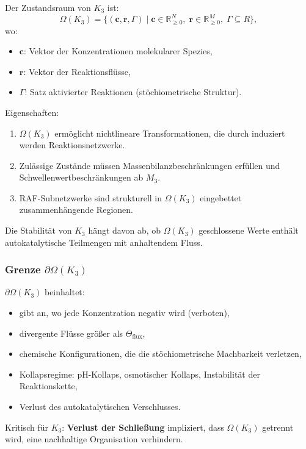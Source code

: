 Der Zustandsraum von $K_3$ ist:
\[
\Omega(K_3) = \{ (\mathbf{c}, \mathbf{r}, \Gamma) \mid
\mathbf{c} \in \mathbb{R}_{\ge0}^N,\;
\mathbf{r} \in \mathbb{R}_{\ge0}^M,\;
\Gamma \subseteq R \},
\]
wo:
\begin{itemize}
    \item $\mathbf{c}$: Vektor der Konzentrationen molekularer Spezies,
    \item $\mathbf{r}$: Vektor der Reaktionsflüsse,
    \item $\Gamma$: Satz aktivierter Reaktionen (stöchiometrische Struktur).
\end{itemize}

Eigenschaften:
\begin{enumerate}
    \item $\Omega(K_3)$ ermöglicht nichtlineare Transformationen, die durch induziert werden
          Reaktionsnetzwerke.
    \item Zulässige Zustände müssen Massenbilanzbeschränkungen erfüllen und
          Schwellenwertbeschränkungen ab $M_3$.
    \item RAF-Subnetzwerke sind strukturell in $\Omega(K_3)$ eingebettet
          zusammenhängende Regionen.
\end{enumerate}

Die Stabilität von $K_3$ hängt davon ab, ob $\Omega(K_3)$ geschlossene Werte enthält
autokatalytische Teilmengen mit anhaltendem Fluss.

\subsubsection{Grenze \texorpdfstring{$\partial\Omega(K_3)$}{\partial\Omega(K_3)}}

$\partial\Omega(K_3)$ beinhaltet:
\begin{itemize}
    \item gibt an, wo jede Konzentration negativ wird (verboten),
    \item divergente Flüsse größer als $\Theta_{\mathrm{flux}}$,
    \item chemische Konfigurationen, die die stöchiometrische Machbarkeit verletzen,
    \item Kollapsregime: pH-Kollaps, osmotischer Kollaps,
          Instabilität der Reaktionskette,
    \item Verlust des autokatalytischen Verschlusses.
\end{itemize}

Kritisch für $K_3$:
\textbf{Verlust der Schließung} impliziert, dass $\Omega(K_3)$ getrennt wird,
eine nachhaltige Organisation verhindern.

